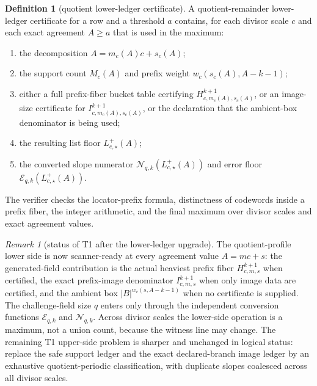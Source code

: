 \documentclass[11pt]{article}
\theoremstyle{definition}
\newtheorem{definition}[theorem]{Definition}
\theoremstyle{remark}
\newtheorem{remark}[theorem]{Remark}
\newcommand{\B}{B}
\begin{document}
\begin{definition}[quotient lower-ledger certificate]
\label{def:quotient-lower-ledger-certificate}
A quotient-remainder lower-ledger certificate for a row and a threshold $a$
contains, for each divisor scale $c$ and each exact agreement $A\ge a$ that is
used in the maximum:
\begin{enumerate}[label=\textup{(\roman*)},leftmargin=2.2em]
\item the decomposition $A=m_c(A)c+s_c(A)$;
\item the support count $M_c(A)$ and prefix weight $w_c(s_c(A),A-k-1)$;
\item either a full prefix-fiber bucket table certifying
$H_{c,m_c(A),s_c(A)}^{k+1}$, or an image-size certificate for
$I_{c,m_c(A),s_c(A)}^{k+1}$, or the declaration that the ambient-box denominator
is being used;
\item the resulting list floor $L_{c,\star}^+(A)$;
\item the converted slope numerator
$\mathcal N_{q,k}(L_{c,\star}^+(A))$ and error floor
$\mathcal E_{q,k}(L_{c,\star}^+(A))$.
\end{enumerate}
The verifier checks the locator-prefix formula, distinctness of codewords inside
a prefix fiber, the integer arithmetic, and the final maximum over divisor
scales and exact agreement values.
\end{definition}

\begin{remark}[status of T1 after the lower-ledger upgrade]
\label{rem:T1-lower-ledger-status}
The quotient-profile lower side is now scanner-ready at every agreement value
$A=mc+s$: the generated-field contribution is the actual heaviest prefix fiber
$H_{c,m,s}^{k+1}$ when certified, the exact prefix-image denominator
$I_{c,m,s}^{k+1}$ when only image data are certified, and the ambient box
$|\B|^{w_c(s,A-k-1)}$ when no certificate is supplied.  The challenge-field size
$q$ enters only through the independent conversion functions
$\mathcal E_{q,k}$ and $\mathcal N_{q,k}$.  Across divisor scales the lower-side
operation is a maximum, not a union count, because the witness line may change.
The remaining T1 upper-side problem is sharper and unchanged in logical status:
replace the safe support ledger and the exact declared-branch image ledger by an
exhaustive quotient-periodic classification, with duplicate slopes coalesced
across all divisor scales.
\end{remark}
\end{document}
